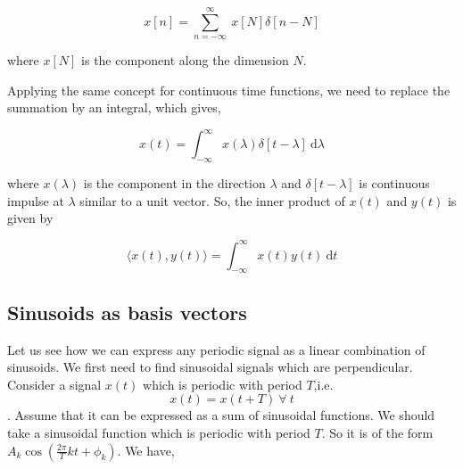     	\begin{equation*}	x[n] = 	\sum_{n=-\infty}^{\infty}\ x[N]\delta[n-N]\end{equation*}
            
            where $x[N]$ is the component along the dimension $N$.
       
Applying the same concept for continuous time functions, we need to replace the summation by an integral, which gives,

					\begin{equation*}x(t) = \int_{-\infty}^{\infty} \! x(\lambda)\delta[t-\lambda] \ \mathrm{d}\lambda\end{equation*}
                    
             where $x(\lambda)$ is the component in the direction $\lambda$ and $\delta[t-\lambda]$ is continuous impulse at $\lambda$ similar to a unit vector. So, the inner product of $x(t)$ and $y(t)$ is given by
             
           \begin{equation*} \langle x(t),y(t) \rangle = \int_{-\infty}^{\infty} \! x(t)y(t) \ \mathrm{d} t\end{equation*}
             
 \subsection{Sinusoids as basis vectors}
          Let us see how we can express any periodic signal as a linear combination of sinusoids. We first need to find sinusoidal signals which are perpendicular. Consider a signal $x(t)$ which is periodic with period $T$,i.e. 
          \begin{equation*}
            x(t) = x(t+T) \ \forall \ t 
          \end{equation*}.
          Assume that it can be expressed as a sum of sinusoidal functions. We should take a sinusoidal function which is periodic with period $T$. So it is of the form $A_k\cos (\frac{2\pi}{T}kt + \phi_k)$. We have,
          
